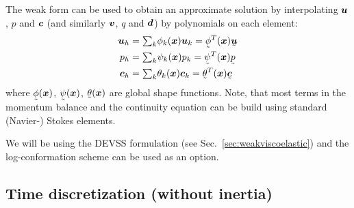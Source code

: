 The weak form can be used to obtain an approximate solution
by interpolating $\boldsymbol{u}$, $p$ and $\boldsymbol{c}$ 
(and similarly $\boldsymbol{v}$, $q$ and $\boldsymbol{d}$) by
polynomials on each element:
\begin{align}
    \vek u_h&=\tsum_k \phi_k(\vek x)\vek u_k=\col\phi^T(\vek x)\col{\vek u}\\
    p_h&=\tsum_k \psi_k(\vek x) p_k=\col\psi^T(\vek x)\col{ p} \\
  \ten c_h&=\tsum_k \theta_k(\vek x)\ten c_k=\col\theta^T(\vek x)\col{\ten c}
  \label{eq:thetaDG}
\end{align}
where $\col\phi(\vek x)$, $\col\psi(\vek x)$, $\col\theta(\vek x)$
are global shape functions. Note, that most terms in the momentum balance and
the continuity equation can be build using standard (Navier-) Stokes elements.

We will be using the DEVSS formulation
(see Sec.~\ref{sec:weakviscoelastic}) and the
log-conformation scheme can be used as an option.

\subsection{Time discretization (without inertia)}
\label{sec:timeDG}

